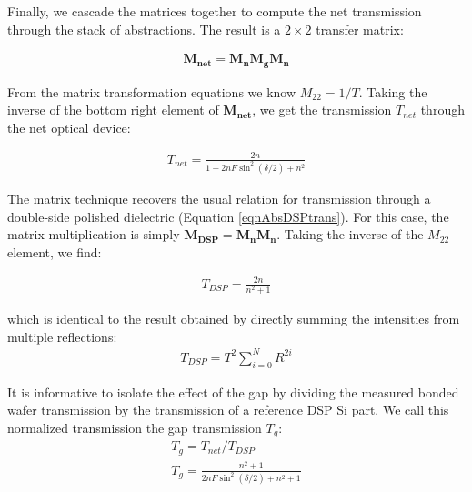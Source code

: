 \documentclass[osajnl,twocolumn,showpacs,superscriptaddress,11pt]{revtex4-1} %
\begin{document}
Finally, we cascade the matrices together to compute the net transmission through the stack of abstractions.  The result is a $2\times2$ transfer matrix:

\begin{eqnarray}
\boldsymbol{M_{net}}=\boldsymbol{M_n}\boldsymbol{M_g}\boldsymbol{M_n}
\end{eqnarray}

From the matrix transformation equations \cite{2007fuph.book.....S} we know $M_{22}=1/T$.  Taking the inverse of the bottom right element of $\boldsymbol{M_{net}}$, we get the transmission $T_{net}$ through the net optical device:

\begin{eqnarray}
T_{net}=\frac{2 n}{1+ 2n F\sin ^2(\delta/2)+n^2} \label{eqn:FPmatTrans}
\end{eqnarray}

The matrix technique recovers the usual relation for transmission through a double-side polished dielectric (Equation \ref{eqnAbsDSPtrans}).  For this case, the matrix multiplication is simply $\boldsymbol{M_{DSP}}=\boldsymbol{M_n}\boldsymbol{M_n}$.  Taking the inverse of the $M_{22}$ element, we find:

\begin{eqnarray}
T_{DSP}=\frac{2 n}{n^2+1}\label{eqn:EqofSummedSlab}
\end{eqnarray}

which is identical to the result obtained by directly summing the intensities from multiple reflections:
\begin{eqnarray}
T_{DSP}=T^2 \sum_{i=0}^{N}R^{2i} \label{eqn:multsum}
\end{eqnarray}

It is informative to isolate the effect of the gap by dividing the measured bonded wafer transmission by the transmission of a reference DSP Si part.  We call this normalized transmission the gap transmission $T_{g}$:
\begin{eqnarray}
T_{g} = T_{net}/T_{DSP} \\
T_{g} = \frac{n^2+1}{2 n F \sin ^2(\delta/2)+n^2+1} \label{eqn:Tetalon}
\end{eqnarray}



%
\end{document}
